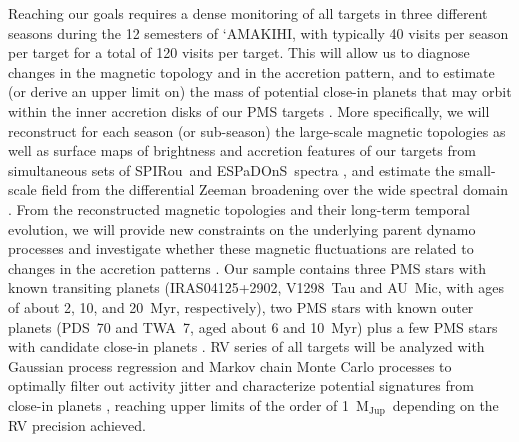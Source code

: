 \documentclass[
    traditabstract,
    longauth,
    onecolumn,
]{aa}
\def \amakihi{`AMAKIHI}
\def \MJ{M$_{\mathrm{Jup}}$}
\def \spi{SPIRou}
\def \esp{ESPaDOnS}
\begin{document}
Reaching our goals requires a dense monitoring of all targets in three different seasons during the 12 semesters of \amakihi, with typically 40 visits per season per target for a total of 120 visits per target.  This will allow us to diagnose changes in the magnetic topology and in the accretion pattern, and to estimate (or derive an upper limit on) the mass of potential close-in planets that may orbit within the inner accretion disks of our PMS targets \citep[as in, e.g.,][]{Donati2026}.  More specifically, we will reconstruct for each season (or sub-season) the large-scale magnetic topologies as well as surface maps of brightness and accretion features of our targets from simultaneous sets of \spi\ and \esp\ spectra \citep[see][]{Donati2024b}, and estimate the small-scale field from the differential Zeeman broadening over the wide spectral domain \citep{Cristofari2025}.  From the reconstructed magnetic topologies and their long-term temporal evolution, we will provide new constraints on the underlying parent dynamo processes and investigate whether these magnetic fluctuations are related to changes in the accretion patterns \citep{Cody_Continuum_2017}.  Our sample contains three PMS stars with known transiting planets (IRAS04125+2902, V1298~Tau and AU~Mic, with ages of about 2, 10, and 20~Myr, respectively), two PMS stars with known outer planets (PDS~70 and TWA~7, aged about 6 and 10~Myr) plus a few PMS stars with candidate close-in planets \citep[e.g.,][]{Zaire2024}.  RV series of all targets will be analyzed with Gaussian process regression and Markov chain Monte Carlo processes to optimally filter out activity jitter and characterize potential signatures from close-in planets \citep{Zaire2024}, reaching upper limits of the order of 1~\MJ\ depending on the RV precision achieved.  

\end{document}
